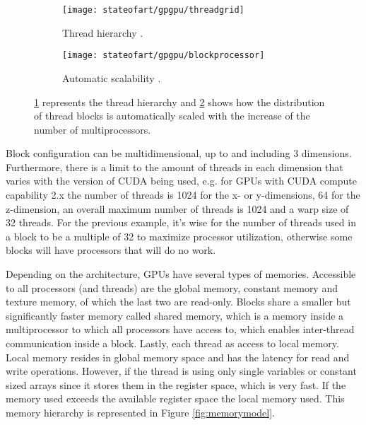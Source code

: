 \begin{figure}[!ht]
    \centering
    \begin{subfigure}[b]{0.45\textwidth}
        \centering
        \texttt{[image: stateofart/gpgpu/threadgrid]}
        \caption{Thread hierarchy \cite{Nvidia2014}.}
        \label{fig:gridthread}
    \end{subfigure}
    \hfill
    \begin{subfigure}[b]{0.45\textwidth}
        \centering
        \texttt{[image: stateofart/gpgpu/blockprocessor]}
        \caption{Automatic scalability \cite{Nvidia2014}.}
        \label{fig:blockprocessor}
    \end{subfigure}
    \caption{\ref{fig:gridthread} represents the thread hierarchy and \ref{fig:blockprocessor} shows how the distribution of thread blocks is automatically scaled with the increase of the number of multiprocessors.}
    \label{fig:cuda fig1}
\end{figure}

Block configuration can be multidimensional, up to and including 3 dimensions.
Furthermore, there is a limit to the amount of threads in each dimension that varies with the version of CUDA being used, e.g. for GPUs with CUDA compute capability 2.x  the number of threads is 1024 for the x- or y-dimensions, 64 for the z-dimension, an overall maximum number of threads is 1024 and a warp size of 32 threads.
For the previous example, it's wise for the number of threads used in a block to be a multiple of 32 to maximize processor utilization, otherwise some blocks will have processors that will do no work.

Depending on the architecture, GPUs have several types of memories.
Accessible to all processors (and threads) are the global memory, constant memory and texture memory, of which the last two are read-only.
Blocks share a smaller but significantly faster memory called shared memory, which is a memory inside a multiprocessor to which all processors have access to, which enables inter-thread communication inside a block.
Lastly, each thread as access to local memory.
Local memory resides in global memory space and has the latency for read and write operations.
However, if the thread is using only single variables or constant sized arrays since it stores them in the register space, which is very fast.
If the memory used exceeds the available register space the local memory used.
This memory hierarchy is represented in Figure \ref{fig:memorymodel}.


